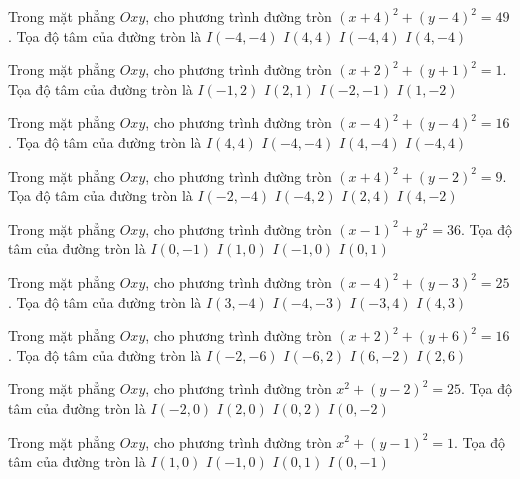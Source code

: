 \begin{ex}
Trong mặt phẳng $Oxy$, cho phương trình đường tròn $(x + 4)^2  + (y -4)^2 = 49$. Tọa độ tâm của đường tròn là
\choice
{ $I(-4, -4)$ }
{ $I(4, 4)$ }
{ \True $I(-4, 4)$ }
{ $I(4, -4)$ }
\end{ex}

\begin{ex}
Trong mặt phẳng $Oxy$, cho phương trình đường tròn $(x + 2)^2  + (y + 1)^2 = 1$. Tọa độ tâm của đường tròn là
\choice
{ $I(-1, 2)$ }
{ $I(2, 1)$ }
{ \True $I(-2, -1)$ }
{ $I(1, -2)$ }
\end{ex}

\begin{ex}
Trong mặt phẳng $Oxy$, cho phương trình đường tròn $(x -4)^2   + (y -4)^2 = 16$. Tọa độ tâm của đường tròn là
\choice
{ \True $I(4, 4)$ }
{ $I(-4, -4)$ }
{ $I(4, -4)$ }
{ $I(-4, 4)$ }
\end{ex}

\begin{ex}
Trong mặt phẳng $Oxy$, cho phương trình đường tròn $(x + 4)^2  + (y -2)^2 = 9$. Tọa độ tâm của đường tròn là
\choice
{ $I(-2, -4)$ }
{ \True $I(-4, 2)$ }
{ $I(2, 4)$ }
{ $I(4, -2)$ }
\end{ex}

\begin{ex}
Trong mặt phẳng $Oxy$, cho phương trình đường tròn $(x -1)^2   + y^2 = 36$. Tọa độ tâm của đường tròn là
\choice
{ $I(0, -1)$ }
{ \True $I(1, 0)$ }
{ $I(-1, 0)$ }
{ $I(0, 1)$ }
\end{ex}

\begin{ex}
Trong mặt phẳng $Oxy$, cho phương trình đường tròn $(x -4)^2   + (y -3)^2 = 25$. Tọa độ tâm của đường tròn là
\choice
{ $I(3, -4)$ }
{ $I(-4, -3)$ }
{ $I(-3, 4)$ }
{ \True $I(4, 3)$ }
\end{ex}

\begin{ex}
Trong mặt phẳng $Oxy$, cho phương trình đường tròn $(x + 2)^2  + (y + 6)^2 = 16$. Tọa độ tâm của đường tròn là
\choice
{ \True $I(-2, -6)$ }
{ $I(-6, 2)$ }
{ $I(6, -2)$ }
{ $I(2, 6)$ }
\end{ex}

\begin{ex}
Trong mặt phẳng $Oxy$, cho phương trình đường tròn $x^2 + (y -2)^2 = 25$. Tọa độ tâm của đường tròn là
\choice
{ $I(-2, 0)$ }
{ $I(2, 0)$ }
{ \True $I(0, 2)$ }
{ $I(0, -2)$ }
\end{ex}

\begin{ex}
Trong mặt phẳng $Oxy$, cho phương trình đường tròn $x^2 + (y -1)^2 = 1$. Tọa độ tâm của đường tròn là
\choice
{ $I(1, 0)$ }
{ $I(-1, 0)$ }
{ \True $I(0, 1)$ }
{ $I(0, -1)$ }
\end{ex}

